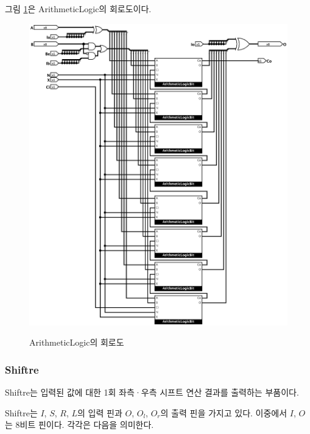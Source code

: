 \documentclass{article}
\renewcommand{\figurename}{그림}
\begin{document}
\figurename{} \ref{fig:al}은 ArithmeticLogic의 회로도이다.

\begin{figure}[p]
    \centering
    \includegraphics[scale=0.35]{ArithmeticLogic} \\
    \caption{ArithmeticLogic의 회로도}
    \label{fig:al}
\end{figure}

\pagebreak

\subsubsection{Shiftre}

Shiftre는 입력된 값에 대한 1회 좌측·우측 시프트 연산 결과를 출력하는
부품이다.

Shiftre는 $I$, $S$, $R$, $L$의 입력 핀과
$O$, $O_l$, $O_r$의 출력 핀을 가지고 있다.
이중에서 $I$, $O$는 8비트 핀이다.
각각은 다음을 의미한다.
\end{document}
